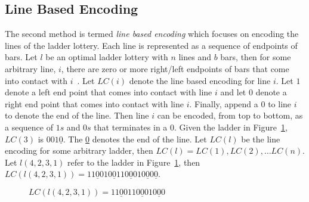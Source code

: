 \subsection{Line Based Encoding}
The second method is termed \emph{line based encoding} which focuses 
on encoding the lines of the ladder lottery. Each line is represented 
as a sequence of endpoints of bars. Let $l$ be an optimal ladder lottery 
with $n$ lines and $b$ bars, then for some arbitrary line, $i$, there 
are zero or more right/left endpoints of bars that 
come into contact with $i$~\cite{A5}. Let $LC(i)$ denote the line based encoding for line $i$.
Let $1$ denote a left end point that 
comes into contact with line $i$ and let $0$ denote a right 
end point that comes into contact with line $i$. Finally, append a $0$
to line $i$ to denote the end of the line. Then line $i$ can be 
encoded, from top to bottom, as a sequence of $1s$ and $0s$ that 
terminates in a $0$.  Given the ladder in Figure~\ref{fig:line-encoding}, 
$LC(3)$ is $001\underline{0}$. The \underline{0} denotes 
the end of the line. Let $LC(l)$ be the line encoding for 
some arbitrary ladder, then $LC(l)=LC(1), LC(2), \dots LC(n)$.
Let $l(4,2,3,1)$ refer to the ladder in Figure~\ref{fig:line-encoding}, then 
$LC(l(4,2,3,1))=11\underline{0}010\underline{0}110\underline{0}010\underline{0}0\underline{0}$.
\begin{figure}[h]
    \begin{center}
      

    \end{center}
    \caption{$LC(l(4,2,3,1))=11\underline{0}0110\underline{0}010\underline{0}0$}
    \label{fig:line-encoding}
\end{figure}
 
